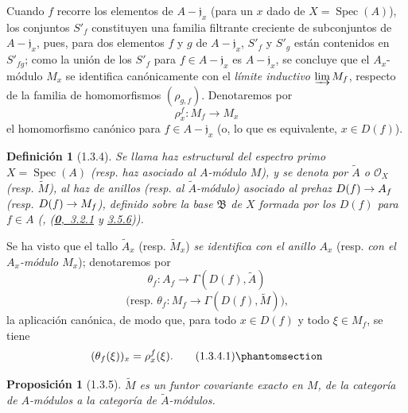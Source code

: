 \documentclass[oneside]{amsart}
\theoremstyle{ega-env-style}
\theoremstyle{ega-thm-env-style}
\newtheorem*{proposition}{Proposición}
\theoremstyle{ega-defn-env-style}
\newtheorem*{definition}{Definición}
\renewcommand{\to}{\mathchoice{\longrightarrow}{\rightarrow}{\rightarrow}{\rightarrow}}
\newcommand{\oldpage}[2][]{{\marginnote{\normalfont{\textbf{#1}~|~#2}}}\ignorespaces}
\let\EGAOriginalLabel\label
\renewcommand{\label}[1]{\phantomsection\EGAOriginalLabel{#1}}
\begin{document}
\oldpage[I]{85}
Cuando $f$ recorre los elementos de $A-\mathfrak{j}_x$ (para un $x$ dado de $X=\operatorname{Spec}(A)$), los conjuntos $S'_f$ constituyen una familia filtrante creciente de subconjuntos de $A-\mathfrak{j}_x$, pues, para dos elementos $f$ y $g$ de $A-\mathfrak{j}_x$, $S'_f$ y $S'_g$ están contenidos en $S'_{fg}$;
como la unión de los $S'_f$ para $f\in A-\mathfrak{j}_x$ es $A-\mathfrak{j}_x$, se concluye  que el $A_x$-módulo $M_x$ se identifica canónicamente con el \emph{límite inductivo} $\varinjlim M_f$, respecto de la familia de homomorfismos $(\rho_{g,f})$.
Denotaremos por
\[
  \rho_x^f:M_f\longrightarrow M_x
\]
el homomorfismo canónico para $f\in A-\mathfrak{j}_x$ (o, lo que es equivalente, $x\in D(f)$).

\begin{definition}[1.3.4]
\label{I.1.3.4}
{\itshape Se llama haz estructural del espectro primo $X=\operatorname{Spec}(A)$ \textup{(resp. \emph{haz asociado al $A$-módulo} $M$)}, y se denota por $\widetilde{A}$ o $\mathscr{O}_X$ \textup{(resp. $\widetilde{M}$)}, al haz de anillos \textup{(resp.} al $\widetilde{A}$-módulo) asociado al prehaz $D(f)\to A_f$ \textup{(resp. $D(f)\to M_f$)}, definido sobre la base $\mathfrak{B}$ de $X$ formada por los $D(f)$ para $f\in A$ \textup{(, (\hyperref[0.3.2.1]{\textbf{0},~3.2.1} y \hyperref[0.3.5.6]{3.5.6}))}.}
\end{definition}

Se ha visto  que el tallo $\widetilde{A}_x$ (resp. $\widetilde{M}_x$) \emph{se identifica con el anillo $A_x$} (resp. \emph{con el $A_x$-módulo $M_x$});
denotaremos por
\[
  \theta_f:A_f\longrightarrow\Gamma(D(f),\widetilde{A})
\]
\[
  \text{(resp. }\theta_f:M_f\longrightarrow
  \Gamma(D(f),\widetilde{M})\text{),}
\]
la aplicación canónica, de modo que, para todo $x\in D(f)$ y todo $\xi\in M_f$, se tiene
\begin{equation}
  (\theta_f(\xi))_x=\rho_x^f(\xi).
  \tag{1.3.4.1}\label{I.1.3.4.1-fr}
\end{equation}

\begin{proposition}[1.3.5]
\label{I.1.3.5}
$\widetilde{M}$ es un funtor covariante exacto en $M$, de la categoría de $A$-módulos a la categoría de $\widetilde{A}$-módulos.
\end{proposition}
\end{document}
